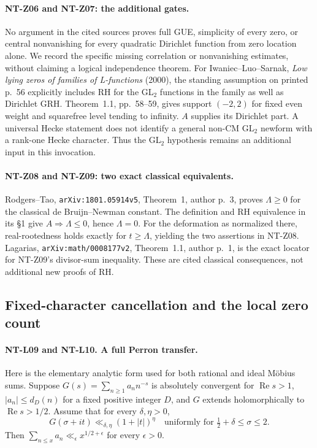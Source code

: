 \paragraph{NT-Z06 and NT-Z07: the additional gates.}
No argument in the cited sources proves full GUE, simplicity of every
zero, or central nonvanishing for every quadratic Dirichlet function
from zero location alone.  We record the specific missing correlation
or nonvanishing estimates, without claiming a logical independence
theorem.  For Iwaniec--Luo--Sarnak, \emph{Low lying zeros of families of
L-functions} (2000), the standing assumption on printed p.~56 explicitly
includes RH for the GL$_2$ functions in the family as well as Dirichlet
GRH.  Theorem~1.1, pp.~58--59, gives support $(-2,2)$ for fixed even
weight and squarefree level tending to infinity.  $A$ supplies its
Dirichlet part.  A universal Hecke statement does not identify a general
non-CM GL$_2$ newform with a rank-one Hecke character.  Thus the GL$_2$
hypothesis remains an additional input in this invocation.

\paragraph{NT-Z08 and NT-Z09: two exact classical equivalents.}
Rodgers--Tao, \texttt{arXiv:1801.05914v5}, Theorem~1, author p.~3,
proves $\Lambda\ge0$ for the classical de Bruijn--Newman constant.
The definition and RH equivalence in its \S1 give
$A\Rightarrow\Lambda\le0$, hence $\Lambda=0$.
For the deformation as normalized there, real-rootedness holds exactly
for $t\ge\Lambda$, yielding the two assertions in NT-Z08.
Lagarias, \texttt{arXiv:math/0008177v2}, Theorem~1.1, author p.~1,
is the exact locator for NT-Z09's divisor-sum inequality.
These are cited classical consequences, not additional new proofs of RH.

\subsection{Fixed-character cancellation and the local zero count}

\paragraph{NT-L09 and NT-L10. A full Perron transfer.}
Here is the elementary analytic form used for both rational and ideal
M\"obius sums.  Suppose
$G(s)=\sum_{n\ge1}a_nn^{-s}$ is absolutely convergent for
$\operatorname{Re}s>1$, $|a_n|\le d_D(n)$ for a fixed positive integer
$D$, and $G$ extends holomorphically to $\operatorname{Re}s>1/2$.
Assume that for every $\delta,\eta>0$,
\[
 G(\sigma+it)\ll_{\delta,\eta}(1+|t|)^\eta
 \quad\text{uniformly for }\tfrac12+\delta\le\sigma\le2.
\tag{NT-Perron-input}
\]
Then $\sum_{n\le x}a_n\ll_\epsilon x^{1/2+\epsilon}$ for every
$\epsilon>0$.

